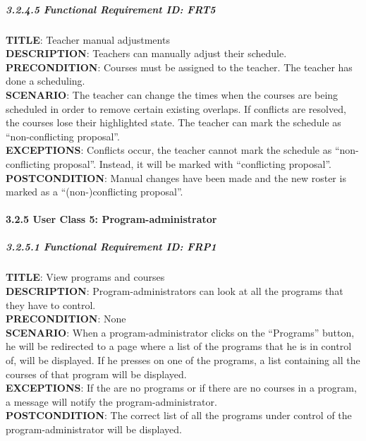 \documentclass[12pt]{article}
\begin{document}
\subparagraph{3.2.4.5 Functional Requirement \textbf{ID}:
FRT5\\}\label{functional-requirement-id-frt5}

\textbf{TITLE}: Teacher manual adjustments\\\textbf{DESCRIPTION}:
Teachers can manually adjust their schedule.\\\textbf{PRECONDITION}:
Courses must be assigned to the teacher. The teacher has done a
scheduling.\\\textbf{SCENARIO}: The teacher can change the times when
the courses are being scheduled in order to remove certain existing
overlaps. If conflicts are resolved, the courses lose their highlighted
state. The teacher can mark the schedule as ``non-conflicting
proposal''.\\\textbf{EXCEPTIONS}: Conflicts occur, the teacher cannot
mark the schedule as ``non-conflicting proposal''. Instead, it will be
marked with ``conflicting proposal''.\\\textbf{POSTCONDITION}: Manual
changes have been made and the new roster is marked as a
``(non-)conflicting proposal''.

\paragraph{3.2.5 User Class 5:
Program-administrator}\label{user-class-5-program-administrator}

\subparagraph{3.2.5.1 Functional Requirement \textbf{ID}:
FRP1\\}\label{functional-requirement-id-frp1}

\textbf{TITLE}: View programs and courses\\\textbf{DESCRIPTION}:
Program-administrators can look at all the programs that they have to
control.\\\textbf{PRECONDITION}: None\\\textbf{SCENARIO}: When a
program-administrator clicks on the ``Programs'' button, he will be
redirected to a page where a list of the programs that he is in control
of, will be displayed. If he presses on one of the programs, a list
containing all the courses of that program will be
displayed.\\\textbf{EXCEPTIONS}: If the are no programs or if there are
no courses in a program, a message will notify the
program-administrator.\\\textbf{POSTCONDITION}: The correct list of all
the programs under control of the program-administrator will be
displayed.
\end{document}
